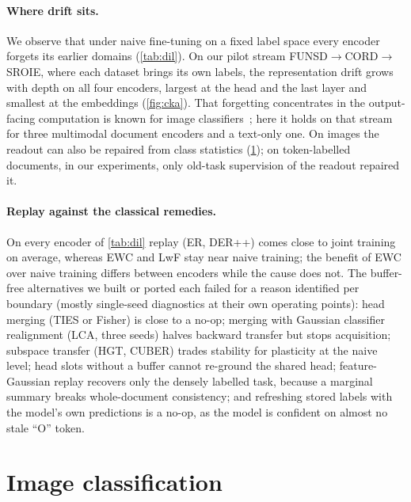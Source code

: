 \paragraph{Where drift sits.} We observe that under naive fine-tuning on a fixed label space every encoder forgets its earlier domains (\cref{tab:dil}). On our pilot stream FUNSD$\rightarrow$CORD$\rightarrow$SROIE, where each dataset brings its own labels, the representation drift grows with depth on all four encoders, largest at the head and the last layer and smallest at the embeddings (\cref{fig:cka}). That forgetting concentrates in the output-facing computation is known for image classifiers~\citep{ramasesh2021anatomy}; here it holds on that stream for three multimodal document encoders and a text-only one. On images the readout can also be repaired from class statistics (\cref{app:image}); on token-labelled documents, in our experiments, only old-task supervision of the readout repaired it.

\paragraph{Replay against the classical remedies.} On every encoder of \cref{tab:dil} replay (ER, DER++) comes close to joint training on average, whereas EWC and LwF stay near naive training; the benefit of EWC over naive training differs between encoders while the cause does not. The buffer-free alternatives we built or ported each failed for a reason identified per boundary (mostly single-seed diagnostics at their own operating points): head merging (TIES or Fisher) is close to a no-op; merging with Gaussian classifier realignment (LCA, three seeds) halves backward transfer but stops acquisition; subspace transfer (HGT, CUBER) trades stability for plasticity at the naive level; head slots without a buffer cannot re-ground the shared head; feature-Gaussian replay recovers only the densely labelled task, because a marginal summary breaks whole-document consistency; and refreshing stored labels with the model's own predictions is a no-op, as the model is confident on almost no stale ``O'' token.

\section{Image classification}
\label{app:image}


